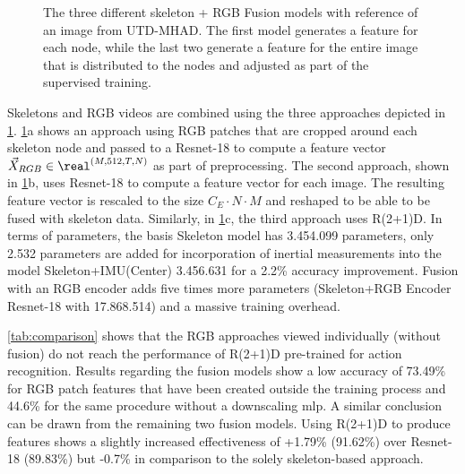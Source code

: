 \begin{figure}[!ht]
    \centering


    \caption[Skeleton + RGB Fusion Models]{The three different skeleton + RGB Fusion models with reference of an image from UTD-MHAD. The first model generates a feature for each node, while the last two generate a feature for the entire image that is distributed to the nodes and adjusted as part of the supervised training.}
    \label{fig:rgb-models}
\end{figure}

Skeletons and RGB videos are combined using the three approaches depicted in \figname\ref{fig:rgb-models}. \figname\ref{fig:rgb-models}a shows an approach using RGB patches that are cropped around each skeleton node and passed to a Resnet-18 to compute a feature vector $\vec{X}_{RGB} \in \real^{(M, 512, T, N)}$ as part of preprocessing. 
The second approach, shown in \figname\ref{fig:rgb-models}b, uses Resnet-18 to compute a feature vector for each image. The resulting feature vector is rescaled to the size $C_E \cdot N \cdot M$ and reshaped to be able to be fused with skeleton data. Similarly, in \figname\ref{fig:rgb-models}c, the third approach uses R(2+1)D.
In terms of parameters, the basis Skeleton model has 3.454.099 parameters, only 2.532 parameters are added for incorporation of inertial measurements into the model Skeleton+IMU(Center) 3.456.631 for a 2.2\% accuracy improvement. Fusion with an RGB
encoder adds five times more parameters (Skeleton+RGB Encoder Resnet-18 with 17.868.514) and a massive training overhead.






\tabname\ref{tab:comparison} shows that the RGB approaches viewed individually (without fusion) do not reach the performance of R(2+1)D pre-trained for action recognition. 
Results regarding the fusion models show a low accuracy of 73.49\% for RGB patch features that have been created outside the training process and 44.6\% for the same procedure without a downscaling \gls{mlp}.
A similar conclusion can be drawn from the remaining two fusion models. 
Using R(2+1)D to produce features shows a slightly increased effectiveness of +1.79\% (91.62\%) over Resnet-18 (89.83\%) but -0.7\% in comparison to the solely skeleton-based approach.

